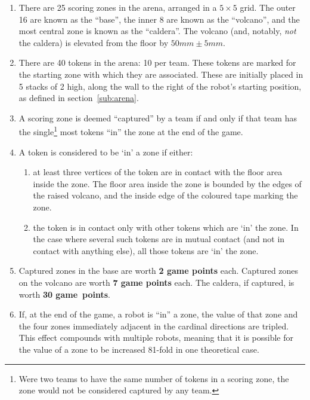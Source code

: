 \begin{enumerate}
\item There are 25 scoring zones in the arena, arranged in a $5\times5$ grid. The outer 16 are known as the ``base'', the inner 8 are known as the ``volcano'', and the most central zone is known as the ``caldera''. The volcano (and, notably, \emph{not} the caldera) is elevated from the floor by $50 mm \pm 5 mm$.

\item There are 40 tokens in the arena: 10 per team. These tokens are marked for the starting zone with which they are associated. These are initially placed in 5 stacks of 2 high, along the wall to the right of the robot's starting position, as defined in section~\ref{sub:arena}.

\item A scoring zone is deemed ``captured'' by a team if and only if that team has the single\footnote{Were two teams to have the same number of tokens in a scoring zone, the zone would not be considered captured by any team.} most tokens ``in'' the zone at the end of the game.

\item A token is considered to be `in' a zone if either:
\begin{enumerate}
  \item at least three vertices of the token are in contact with the floor area inside the zone. The floor area inside the zone is bounded by the edges of the raised volcano, and the inside edge of the coloured tape marking the zone.
  \item the token is in contact only with other tokens which are `in' the zone. In the case where several such tokens are in mutual contact (and not in contact with anything else), all those tokens are `in' the zone.
\end{enumerate}

\item Captured zones in the base are worth \textbf{2 game points} each. Captured zones on the volcano are worth \textbf{7 game points} each. The caldera, if captured, is worth \textbf{30 game~points}.

\item If, at the end of the game, a robot is ``in'' a zone, the value of that zone and the four zones immediately adjacent in the cardinal directions are tripled. This effect compounds with multiple robots, meaning that it is possible for the value of a zone to be increased 81-fold in one theoretical case.  %


\end{enumerate}
